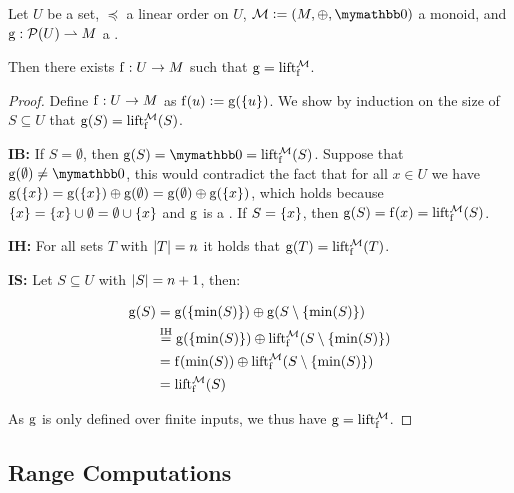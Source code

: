 \documentclass[conference]{IEEEtran}
\begin{document}
\begin{proposition}
Let $U$ be a set, $\preceq$ a linear order on $U$, $\mathcal{M} \defeq (M, \groupaddsym, \neutraladd)$ a monoid, and ${\operatorname{g}}: {\mathcal{P}({U})} \rightharpoonup{M}$ a \somewhatmorphism{}.

Then there exists ${\operatorname{f}}: {U} \rightarrow {M}$ such that $\operatorname{g} = \operatorname{lift_{\operatorname{f}}^{\mathcal{M}}}$.
\end{proposition}

\begin{proof}
Define ${\operatorname{f}}: {U} \rightarrow {M}$ as $\operatorname{f}(u) \vcentcolon= \operatorname{g}(\{u\})$. We show by induction on the size of $S \subseteq U$ that $\operatorname{g}(S) = \operatorname{lift_{f}^{\mathcal{M}}}(S)$.


\textbf{IB:} If $S = \emptyset$, then $\g(S) = \neutraladd = \lift{\f}{\mathcal{M}}(S)$. Suppose that $\g(\emptyset) \neq \neutraladd$, this would contradict the fact that for all $x \in U$ we have $\operatorname{g}(\{x\}) = \operatorname{g}(\{x\}) \oplus \operatorname{g}(\emptyset) = \operatorname{g}(\emptyset) \oplus \operatorname{g}(\{x\})$, which holds because $\{x\} = \{x\} \cup \emptyset = \emptyset \cup \{x\}$ and $\operatorname{g}$ is a \somewhatmorphism{}. If $S = \{x\}$, then $\operatorname{g}(S) = \operatorname{f}(x) = \operatorname{lift_{\operatorname{f}}^{\mathcal{M}}}(S)$.

\textbf{IH:} For all sets $T$ with $|{T}| = n$ it holds that $\operatorname{g}(T) = \operatorname{lift_{\operatorname{f}}^{\mathcal{M}}}(T)$.

\textbf{IS:} Let $S \subseteq U$ with $|{S}| = n + 1$, then:

\vspace{-0.5cm}
\begin{align*}
\operatorname{g}(S) &= \operatorname{g}(\{\min(S)\}) \oplus \operatorname{g}(S \setminus \{\min(S)\})\\
&\overset{\text{IH}}= \operatorname{g}(\{\min(S)\}) \oplus \operatorname{lift_{\operatorname{f}}^{\mathcal{M}}}(S \setminus \{\min(S)\})\\
&= \operatorname{f}(\min(S)) \oplus \operatorname{lift_{\operatorname{f}}^{\mathcal{M}}}(S \setminus \{\min(S)\})\\
&= \operatorname{lift_{\operatorname{f}}^{\mathcal{M}}}(S)\\
\end{align*}

\vspace{-0.5cm}
As $\operatorname{g}$ is only defined over finite inputs, we thus have $\operatorname{g} = \operatorname{lift_{\operatorname{f}}^{\mathcal{M}}}$.
\end{proof}

\subsection{Range Computations}
\end{document}
